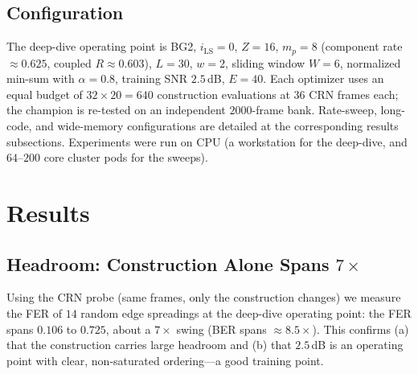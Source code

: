 \documentclass[journal]{IEEEtran}
\begin{document}
\subsection{Configuration}
The deep-dive operating point is BG2, $i_{\mathrm{LS}}{=}0$, $Z{=}16$,
$m_p{=}8$ (component rate $\approx0.625$, coupled $R\approx0.603$), $L{=}30$,
$w{=}2$, sliding window $W{=}6$, normalized min-sum with $\alpha{=}0.8$,
training SNR $2.5$\,dB, $E{=}40$. Each optimizer uses an equal budget of
$32\times20 = 640$ construction evaluations at $36$ CRN frames each; the champion
is re-tested on an independent $2000$-frame bank. Rate-sweep, long-code, and
wide-memory configurations are detailed at the corresponding results
subsections. Experiments were run on CPU (a workstation for the deep-dive, and
$64$--$200$ core cluster pods for the sweeps).

\section{Results}\label{sec:results}

\subsection{Headroom: Construction Alone Spans $7\times$}
\label{sec:results-headroom}
Using the CRN probe (same frames, only the construction changes) we measure the
FER of $14$ random edge spreadings at the deep-dive operating point: the FER
spans $0.106$ to $0.725$, about a $7\times$ swing (BER spans $\approx\!8.5\times$).
This confirms (a) that the construction carries large headroom and (b) that
$2.5$\,dB is an operating point with clear, non-saturated ordering---a good
training point.
\end{document}

